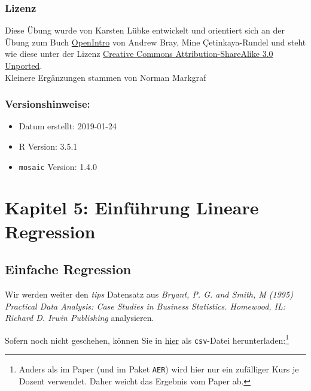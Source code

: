 \documentclass[12pt,ngerman,paper=a4,pagesize,DIV=13]{scrreprt}
\providecommand{\tightlist}{%
  \setlength{\itemsep}{0pt}\setlength{\parskip}{0pt}}
\begin{document}
\hypertarget{lizenz-4}{%
\subsection{Lizenz}\label{lizenz-4}}

Diese Übung wurde von Karsten Lübke entwickelt und orientiert sich an
der Übung zum Buch
\href{https://www.openintro.org/stat/index.php?stat_book=isrs}{OpenIntro}
von Andrew Bray, Mine Çetinkaya-Rundel und steht wie diese unter der
Lizenz \href{http://creativecommons.org/licenses/by-sa/3.0}{Creative
Commons Attribution-ShareAlike 3.0 Unported}.\\
Kleinere Ergänzungen stammen von Norman Markgraf

\hypertarget{versionshinweise-4}{%
\subsection{Versionshinweise:}\label{versionshinweise-4}}

\begin{itemize}
\tightlist
\item
  Datum erstellt: 2019-01-24
\item
  R Version: 3.5.1
\item
  \texttt{mosaic} Version: 1.4.0
\end{itemize}

\hypertarget{kapitel-5-einfuhrung-lineare-regression}{%
\chapter{Kapitel 5: Einführung Lineare
Regression}\label{kapitel-5-einfuhrung-lineare-regression}}

\hypertarget{einfache-regression}{%
\section{Einfache Regression}\label{einfache-regression}}

Wir werden weiter den \emph{tips} Datensatz aus \emph{Bryant, P. G. and
Smith, M (1995) Practical Data Analysis: Case Studies in Business
Statistics. Homewood, IL: Richard D. Irwin Publishing} analysieren.

Sofern noch nicht geschehen, können Sie in
\href{https://goo.gl/whKjnl}{hier} als \texttt{csv}-Datei
herunterladen:\footnote{Anders als im Paper (und im Paket \texttt{AER})
  wird hier nur ein zufälliger Kurs je Dozent verwendet. Daher weicht
  das Ergebnis vom Paper ab.}
\end{document}
